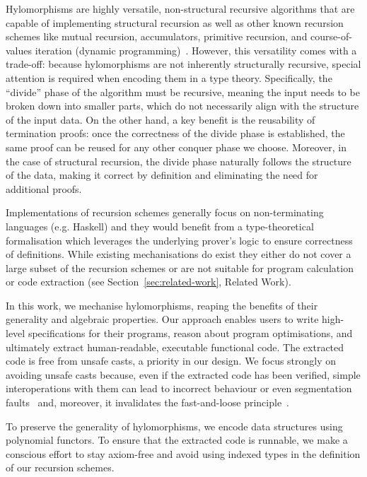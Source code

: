 \documentclass[a4paper,UKenglish,cleveref, autoref, thm-restate]{lipics-v2021}
\begin{document}
Hylomorphisms are highly versatile, non-structural recursive algorithms that are
capable of implementing structural recursion as well as other known recursion
schemes like mutual recursion, accumulators, primitive recursion, and
course-of-values iteration (dynamic programming)~\cite{HinzeWG15}. However, this
versatility comes with a trade-off: because hylomorphisms are not inherently
structurally recursive, special attention is required when encoding them in a
type theory. Specifically, the ``divide'' phase of the algorithm must be
recursive, meaning the input needs to be broken down into smaller parts, which
do not necessarily align with the structure of the input data. On the other
hand, a key benefit is the reusability of termination proofs: once the
correctness of the divide phase is established, the same proof can be reused for
any other conquer phase we choose. Moreover, in the case of structural
recursion, the divide phase naturally follows the structure of the data, making
it correct by definition and eliminating the need for additional proofs.

Implementations of recursion schemes generally focus on non-terminating
languages (e.g. Haskell) and they would benefit from a type-theoretical
formalisation which leverages the underlying prover's logic to ensure
correctness of definitions.  While existing mechanisations do exist they either
do not cover a large subset of the recursion schemes or are not suitable for
program calculation or code extraction (see Section~\ref{sec:related-work},
Related Work).

In this work, we mechanise hylomorphisms, reaping the benefits of their
generality and algebraic properties. Our approach enables users to write
high-level specifications for their programs, reason about program
optimisations, and ultimately extract human-readable, executable functional
code. The extracted code is free from unsafe casts, a priority in our design. We
focus strongly on avoiding unsafe casts because, even if the extracted code has
been verified, simple interoperations with them can lead to incorrect behaviour
or even segmentation faults~\cite{forster:hal-04329663} and, moreover, it
invalidates the fast-and-loose principle~\cite{DanielssonHJG06}.

To preserve the generality of hylomorphisms, we encode data structures using
polynomial functors. To ensure that the extracted code is runnable, we make a
conscious effort to stay axiom-free and avoid using indexed types in the
definition of our recursion schemes.
\end{document}
